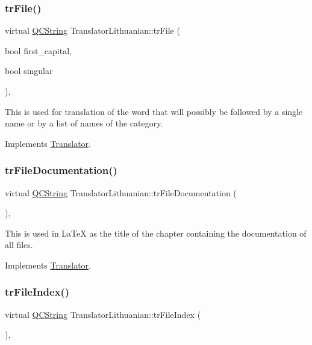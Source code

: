 \subsubsection{\texorpdfstring{trFile()}{trFile()}}
{\footnotesize\ttfamily virtual \mbox{\hyperlink{class_q_c_string}{Q\+C\+String}} Translator\+Lithuanian\+::tr\+File (\begin{DoxyParamCaption}\item[{bool}]{first\+\_\+capital,  }\item[{bool}]{singular }\end{DoxyParamCaption})\hspace{0.3cm}{\ttfamily [inline]}, {\ttfamily [virtual]}}

This is used for translation of the word that will possibly be followed by a single name or by a list of names of the category. 

Implements \mbox{\hyperlink{class_translator}{Translator}}.

\mbox{\label{class_translator_lithuanian_a6febf8e6f5828b2cfc604c0a9e482446}} 
\subsubsection{\texorpdfstring{trFileDocumentation()}{trFileDocumentation()}}
{\footnotesize\ttfamily virtual \mbox{\hyperlink{class_q_c_string}{Q\+C\+String}} Translator\+Lithuanian\+::tr\+File\+Documentation (\begin{DoxyParamCaption}{ }\end{DoxyParamCaption})\hspace{0.3cm}{\ttfamily [inline]}, {\ttfamily [virtual]}}

This is used in La\+TeX as the title of the chapter containing the documentation of all files. 

Implements \mbox{\hyperlink{class_translator}{Translator}}.

\mbox{\label{class_translator_lithuanian_a3de49f1eeffb84241fd0819dc5e24c40}} 
\subsubsection{\texorpdfstring{trFileIndex()}{trFileIndex()}}
{\footnotesize\ttfamily virtual \mbox{\hyperlink{class_q_c_string}{Q\+C\+String}} Translator\+Lithuanian\+::tr\+File\+Index (\begin{DoxyParamCaption}{ }\end{DoxyParamCaption})\hspace{0.3cm}{\ttfamily [inline]}, {\ttfamily [virtual]}}

